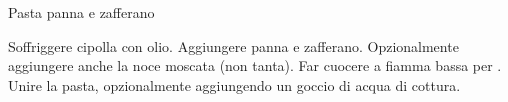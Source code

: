 \begin{recipe}{Pasta panna e zafferano}
    \begin{header}
    
    \end{header}
    
    \begin{ingredients}
    \end{ingredients}
    
    \begin{preparation}
        \step Soffriggere cipolla con olio.
        \step Aggiungere panna e zafferano.\newline
            Opzionalmente aggiungere anche la noce moscata (non tanta).
        \step Far cuocere a fiamma bassa per .
        \step Unire la pasta, opzionalmente aggiungendo un goccio di acqua di cottura.
    \end{preparation}
\end{recipe}
